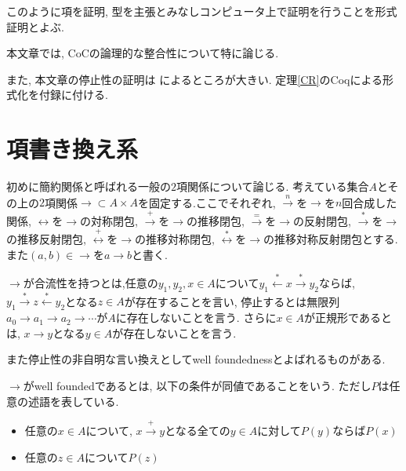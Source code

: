 \documentclass[12pt, titlepage]{ltjsarticle}
\begin{document}
このように項を証明, 型を主張とみなしコンピュータ上で証明を行うことを形式証明とよぶ.



本文章では, CoCの論理的な整合性について特に論じる.

また, 本文章の停止性の証明は \cite{geuvers1994short}によるところが大きい.
定理\ref{CR}のCoqによる形式化を付録に付ける.

\section{項書き換え系}
初めに簡約関係と呼ばれる一般の$2$項関係について論じる. 考えている集合$A$とその上の$2$項関係$\rightarrow \subset A \times A$を固定する.ここでそれぞれ,
$\xrightarrow{n}$を$\rightarrow$を$n$回合成した関係,
$\leftrightarrow$を$\rightarrow$の対称閉包,
$\xrightarrow{+}$を$\rightarrow$の推移閉包,
$\xrightarrow{=}$を$\rightarrow$の反射閉包,
$\overset{*}{\rightarrow}$を$\rightarrow$の推移反射閉包,
$\overset{+}{\leftrightarrow}$を$\rightarrow$の推移対称閉包,
$\overset{*}{\leftrightarrow}$を$\rightarrow$の推移対称反射閉包とする.
また$(a, b) \in \rightarrow$を$a \rightarrow b$と書く.

\begin{defn}
$\rightarrow$が合流性を持つとは,任意の$y_{1},y_{2},x \in A$について$y_1 \overset{*}{\leftarrow} x \overset{*}{\rightarrow} y_2$ならば, $y_1 \overset{*}{\rightarrow} z \overset{*}{\leftarrow} y_2$となる$z \in A$が存在することを言い, 停止するとは無限列$a_0 \rightarrow a_1 \rightarrow a_2 \rightarrow \cdots$が$A$に存在しないことを言う. さらに$x \in A$が正規形であるとは, $x \rightarrow y$となる$y \in A$が存在しないことを言う.
\end{defn}

また停止性の非自明な言い換えとしてwell foundednessとよばれるものがある.

\begin{defn}
$\rightarrow$がwell foundedであるとは, 以下の条件が同値であることをいう. ただし$P$は任意の述語を表している.
 \begin{itemize}
  \item 任意の$x \in A$について, $x \xrightarrow{+} y$となる全ての$y \in A$に対して$P(y)$ならば$P(x)$
  \item 任意の$z \in A$について$P(z)$
 \end{itemize}
\end{defn}
\end{document}
